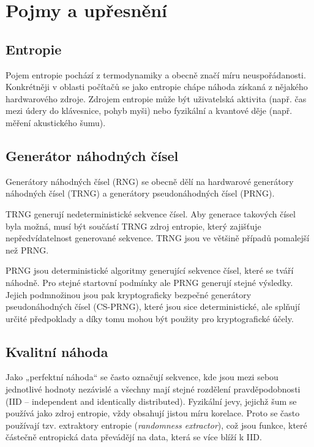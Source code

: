 \documentclass[a4paper,12pt]{article}
\begin{document}
	\nofootaddress
	
	\section{Pojmy a upřesnění}
	
	\subsection{Entropie}
	
	Pojem entropie pochází z termodynamiky a obecně značí míru neuspořádanosti. Konkrétněji v oblasti počítačů se jako entropie chápe náhoda získaná z nějakého hardwarového zdroje. Zdrojem entropie může být uživatelská aktivita (např. čas mezi údery do klávesnice, pohyb myši) nebo fyzikální a kvantové děje (např. měření akustického šumu).
	
	\subsection{Generátor náhodných čísel}
	
	Generátory náhodných čísel (RNG) se obecně dělí na hardwarové generátory náhodných čísel (TRNG) a generátory pseudonáhodných čísel (PRNG).
	
	TRNG generují nedeterministické sekvence čísel. Aby generace takových čísel byla možná, musí být součástí TRNG zdroj entropie, který zajišťuje nepředvídatelnost generované sekvence. TRNG jsou ve většině případů pomalejší než PRNG.
	
	PRNG jsou deterministické algoritmy generující sekvence čísel, které se tváří náhodně. Pro stejné startovní podmínky ale PRNG generují stejné výsledky. Jejich podmnožinou jsou pak kryptograficky bezpečné generátory pseudonáhodných čísel (CS-PRNG), které jsou sice deterministické, ale splňují určité předpoklady a díky tomu mohou být použity pro kryptografické účely.
	
	\subsection{Kvalitní náhoda}
	
	Jako „perfektní náhoda“ se často označují sekvence, kde jsou mezi sebou jednotlivé hodnoty nezávislé a všechny mají stejné rozdělení pravděpodobnosti (IID – independent and identically distributed). Fyzikální jevy, jejichž šum se používá jako zdroj entropie, vždy obsahují jistou míru korelace. Proto se často používají tzv. extraktory entropie (\textit{\mbox{randomness} extractor}), což jsou funkce, které částečně entropická data převádějí na data, která se více blíží k IID.
	
\end{document}
